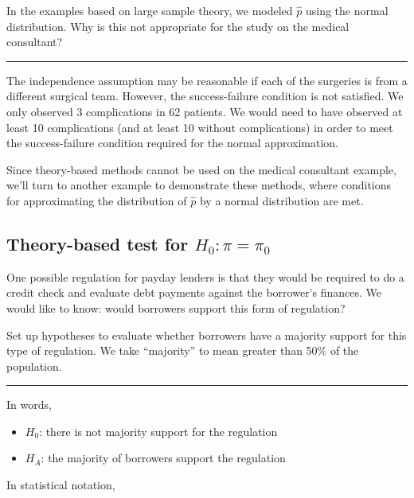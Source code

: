 \documentclass[
  10pt,
  openany]{book}
\providecommand{\tightlist}{%
  \setlength{\itemsep}{0pt}\setlength{\parskip}{0pt}}
\theoremstyle{definition}
\theoremstyle{definition}
\theoremstyle{definition}
\theoremstyle{definition}
\theoremstyle{remark}
\begin{document}
In the examples based on large sample theory, we modeled \(\hat{p}\) using the normal distribution. Why is this not appropriate for the study on the medical consultant?

\begin{center}\rule{0.5\linewidth}{0.5pt}\end{center}

The independence assumption may be reasonable if each of the surgeries is from a different surgical team. However, the success-failure condition is not satisfied. We only observed 3 complications in 62 patients. We would need to have observed at least 10 complications (and at least 10 without complications) in order to meet the success-failure condition required for the normal approximation.

Since theory-based methods cannot be used on the medical consultant example, we'll turn to another example to demonstrate these methods, where conditions for approximating the distribution of \(\hat{p}\) by a normal distribution are met.

\subsection{\texorpdfstring{Theory-based test for \(H_0: \pi = \pi_0\)}{Theory-based test for H\_0: \textbackslash pi = \textbackslash pi\_0}}\label{payday-lenders}

One possible regulation for payday lenders is that they would be required to do a credit check and evaluate debt payments against the borrower's finances. We would like to know: would borrowers support this form of regulation?

Set up hypotheses to evaluate whether borrowers have a majority support for this type of regulation. We take ``majority'' to mean greater than 50\% of the population.

\begin{center}\rule{0.5\linewidth}{0.5pt}\end{center}

In words,

\begin{itemize}
\tightlist
\item
  \(H_0\): there is not majority support for the regulation
\item
  \(H_A\): the majority of borrowers support the regulation
\end{itemize}

In statistical notation,
\end{document}
